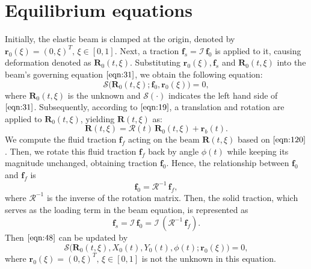 \documentclass[a4paper,12pt]{article}
\begin{document}
\section{Equilibrium equations}
Initially, the elastic beam is clamped at the origin, denoted by $\textbf{r}_0(\xi)=(0,\xi)^T,\,\xi\in [0,1]$. Next, a traction $\mathbf{f}_s=\mathcal{I}\,\textbf{f}_0$  is applied to it, causing deformation denoted as $\textbf{R}_0(t,\xi)$. Substituting 
$\textbf{r}_0(\xi), \textbf{f}_s$ and $\textbf{R}_0(t,\xi)$ into the beam's governing equation $\eqref{eqn:31}$, we obtain the following equation:
\begin{equation}
	\label{eqn:48}
	\bm{\mathcal{S}}\Big(\textbf{R}_0(t,\xi);\textbf{f}_0,\textbf{r}_0(\xi)\Big)=0,
\end{equation}
where $\textbf{R}_0(t,\xi)$ is the unknown and $\bm{\mathcal{S}}(\cdot)$ indicates the left hand side of $\eqref{eqn:31}$.
Subsequently, according to $\eqref{eqn:19}$, a translation and rotation are applied to 
$\textbf{R}_0(t,\xi)$, yielding $\textbf{R}(t,\xi)$ as:
\begin{equation}
	\label{eqn:49}
	\textbf{R}(t,\xi)=\bm{\mathcal{R}}(t)\,\textbf{R}_0(t,\xi)+\textbf{r}_b(t).
\end{equation}
 We compute the fluid traction $\textbf{f}_f$ acting on the beam $\textbf{R}(t,\xi)$ based on $\eqref{eqn:120}$. Then, we rotate this fluid traction $\textbf{f}_f$ back by angle $\phi(t)$ while keeping its magnitude unchanged, obtaining traction $\textbf{f}_0$. Hence, the relationship between $\textbf{f}_0$ and $\textbf{f}_f$ is 
\begin{equation}
	\label{eqn:50}
	\textbf{f}_0=\bm{\mathcal{R}}^{-1}\,\textbf{f}_f,
\end{equation}
where $\bm{\mathcal{R}}^{-1}$ is the inverse of the rotation matrix. Then, the solid traction, which serves as the loading term in the beam equation, is represented as 
\begin{equation}
	\label{eqn:67}
	\textbf{f}_s=\mathcal{I}\,\textbf{f}_0=\mathcal{I}\,\left(\bm{\mathcal{R}}^{-1}\,\textbf{f}_f\right).
\end{equation}
Then $\eqref{eqn:48}$ can be updated by
\begin{equation}
	\label{eqn:51}
	\bm{\mathcal{S}}\Big(\textbf{R}_0(t,\xi), X_0(t), Y_0(t),\phi(t);\textbf{r}_0(\xi)\Big)=0,
\end{equation}
where $\textbf{r}_0(\xi)=(0,\xi)^T,\,\xi\in [0,1]$ is not the unknown in this equation.
\end{document}
